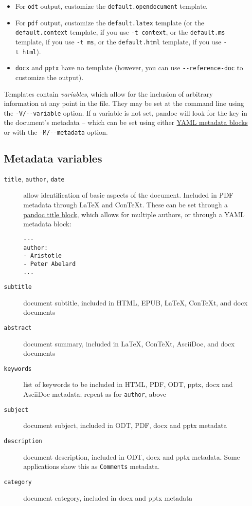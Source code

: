 \documentclass[
]{article}
\providecommand{\tightlist}{%
  \setlength{\itemsep}{0pt}\setlength{\parskip}{0pt}}
\begin{document}
\begin{itemize}
\tightlist
\item
  For \texttt{odt} output, customize the \texttt{default.opendocument}
  template.
\item
  For \texttt{pdf} output, customize the \texttt{default.latex} template
  (or the \texttt{default.context} template, if you use
  \texttt{-t\ context}, or the \texttt{default.ms} template, if you use
  \texttt{-t\ ms}, or the \texttt{default.html} template, if you use
  \texttt{-t\ html}).
\item
  \texttt{docx} and \texttt{pptx} have no template (however, you can use
  \texttt{-\/-reference-doc} to customize the output).
\end{itemize}

Templates contain \emph{variables}, which allow for the inclusion of
arbitrary information at any point in the file. They may be set at the
command line using the \texttt{-V/-\/-variable} option. If a variable is
not set, pandoc will look for the key in the document's metadata --
which can be set using either
\protect\hyperlink{extension-yaml_metadata_block}{YAML metadata blocks}
or with the \texttt{-M/-\/-metadata} option.

\hypertarget{metadata-variables}{%
\subsection{Metadata variables}\label{metadata-variables}}

\begin{description}
\item[\texttt{title}, \texttt{author}, \texttt{date}]
allow identification of basic aspects of the document. Included in PDF
metadata through LaTeX and ConTeXt. These can be set through a
\protect\hyperlink{extension-pandoc_title_block}{pandoc title block},
which allows for multiple authors, or through a YAML metadata block:

\begin{verbatim}
---
author:
- Aristotle
- Peter Abelard
...
\end{verbatim}
\item[\texttt{subtitle}]
document subtitle, included in HTML, EPUB, LaTeX, ConTeXt, and docx
documents
\item[\texttt{abstract}]
document summary, included in LaTeX, ConTeXt, AsciiDoc, and docx
documents
\item[\texttt{keywords}]
list of keywords to be included in HTML, PDF, ODT, pptx, docx and
AsciiDoc metadata; repeat as for \texttt{author}, above
\item[\texttt{subject}]
document subject, included in ODT, PDF, docx and pptx metadata
\item[\texttt{description}]
document description, included in ODT, docx and pptx metadata. Some
applications show this as \texttt{Comments} metadata.
\item[\texttt{category}]
document category, included in docx and pptx metadata
\end{description}
\end{document}
